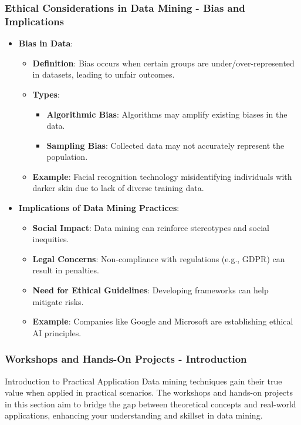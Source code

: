 \documentclass[aspectratio=169]{beamer}
\begin{document}
\begin{frame}[fragile]
    \frametitle{Ethical Considerations in Data Mining - Bias and Implications}
    \begin{itemize}
        \item \textbf{Bias in Data}:
            \begin{itemize}
                \item \textbf{Definition}: Bias occurs when certain groups are under/over-represented in datasets, leading to unfair outcomes.
                \item \textbf{Types}:
                    \begin{itemize}
                        \item \textbf{Algorithmic Bias}: Algorithms may amplify existing biases in the data.
                        \item \textbf{Sampling Bias}: Collected data may not accurately represent the population.
                    \end{itemize}
                \item \textbf{Example}: Facial recognition technology misidentifying individuals with darker skin due to lack of diverse training data.
            \end{itemize}
        \item \textbf{Implications of Data Mining Practices}:
            \begin{itemize}
                \item \textbf{Social Impact}: Data mining can reinforce stereotypes and social inequities.
                \item \textbf{Legal Concerns}: Non-compliance with regulations (e.g., GDPR) can result in penalties.
                \item \textbf{Need for Ethical Guidelines}: Developing frameworks can help mitigate risks.
                \item \textbf{Example}: Companies like Google and Microsoft are establishing ethical AI principles.
            \end{itemize}
    \end{itemize}
\end{frame}

\begin{frame}[fragile]
    \frametitle{Workshops and Hands-On Projects - Introduction}
    \begin{block}{Introduction to Practical Application}
        Data mining techniques gain their true value when applied in practical scenarios. The workshops and hands-on projects in this section aim to bridge the gap between theoretical concepts and real-world applications, enhancing your understanding and skillset in data mining.
    \end{block}
\end{frame}
\end{document}
